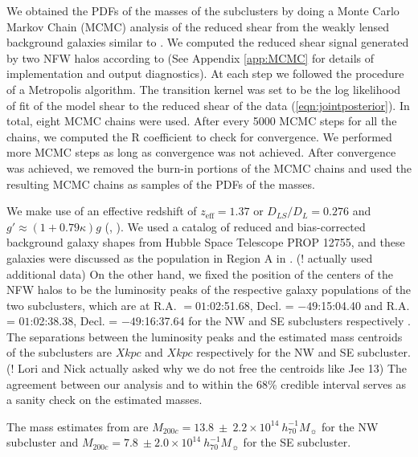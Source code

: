 We obtained the PDFs of the masses of the subclusters by doing a Monte
Carlo Markov Chain (MCMC) analysis of the reduced shear from the
weakly lensed background galaxies similar to \citet{Dawson12}. We computed the reduced shear signal
generated by two NFW halos according to \citet{Umetsu10} (See Appendix
\ref{app:MCMC} for
details of implementation and output diagnostics).
At each step we followed the procedure of a
Metropolis algorithm.  The transition kernel was set to
be the log likelihood of fit of the model shear to the reduced shear of the
data (\ref{eqn:jointposterior}).
In total, eight MCMC chains were used. After every 5000 MCMC steps for all
the chains, we computed the R coefficient \citep{Gelman92}  to
check for convergence. We performed more MCMC steps as long as convergence
was not achieved. After convergence was achieved, we removed the
burn-in portions of the MCMC chains and used the resulting MCMC chains as
samples of the PDFs of the masses. \par 
We make use of an effective redshift of $z_{\text{eff}} = 1.37$ or $D_{LS}
/ D_L = 0.276$  and $g'\approx(1 + 0.79 \kappa)g$
(, \citealt{Seitz97}).    
We used a catalog of reduced and bias-corrected background 
galaxy shapes from Hubble Space Telescope PROP 12755, and these galaxies
were discussed as the population in Region A in
. (! \citealt{Jee13} actually used
additional data) On the other hand, we fixed the
position of the centers of the NFW halos to be  the luminosity peaks of the
respective galaxy populations of  the two subclusters, which are at R.A. $=
01$:02:51.68, Decl. = $-49$:15:04.40 and R.A. = $01$:02:38.38, Decl. =
$-49$:16:37.64 for the NW and SE subclusters
respectively . The separations between the luminosity
peaks and the estimated mass centroids of the subclusters are $X kpc$ and
$X kpc$ respectively for the NW and SE subcluster.  (! Lori and Nick actually asked why we do not free
the centroids like Jee 13)  The agreement between our analysis and  to within
the 68\% credible interval serves as a sanity check on the estimated masses. 

The mass estimates from \citealt{Jee13} are $M_{200c} = 13.8~\pm~2.2\times
10^{14}~h_{70}^{-1} M_{\sun}$ for the NW subcluster and $M_{200c} = 7.8~\pm
2.0\times10^{14}~h_{70}^{-1} M_{\sun}$ for the SE subcluster. 
